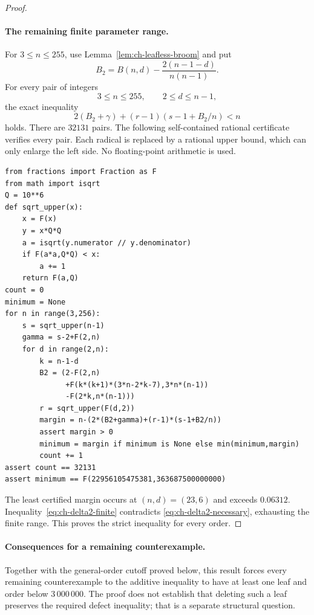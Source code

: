 \documentclass[11pt,a4paper]{article}
\theoremstyle{remark}
\numberwithin{equation}{section}
\begin{document}
\begin{proof}
\paragraph{The remaining finite parameter range.}
For \(3\le n\le255\), use Lemma~\ref{lem:ch-leafless-broom} and put
\[
 B_2=B(n,d)-\frac{2(n-1-d)}{n(n-1)}.
\]
For every pair of integers
\[
 3\le n\le255,\qquad 2\le d\le n-1,
\]
the exact inequality
\begin{equation}\label{eq:ch-delta2-finite}
 2(B_2+\gamma)+(r-1)(s-1+B_2/n)<n
\end{equation}
holds. There are \(32131\) pairs. The following self-contained rational
certificate verifies every pair. Each radical is replaced by a rational
upper bound, which can only enlarge the left side. No floating-point
arithmetic is used.

\begin{lstlisting}[basicstyle=\ttfamily\footnotesize,breaklines=true]
from fractions import Fraction as F
from math import isqrt
Q = 10**6
def sqrt_upper(x):
    x = F(x)
    y = x*Q*Q
    a = isqrt(y.numerator // y.denominator)
    if F(a*a,Q*Q) < x:
        a += 1
    return F(a,Q)
count = 0
minimum = None
for n in range(3,256):
    s = sqrt_upper(n-1)
    gamma = s-2+F(2,n)
    for d in range(2,n):
        k = n-1-d
        B2 = (2-F(2,n)
              +F(k*(k+1)*(3*n-2*k-7),3*n*(n-1))
              -F(2*k,n*(n-1)))
        r = sqrt_upper(F(d,2))
        margin = n-(2*(B2+gamma)+(r-1)*(s-1+B2/n))
        assert margin > 0
        minimum = margin if minimum is None else min(minimum,margin)
        count += 1
assert count == 32131
assert minimum == F(22956105475381,363687500000000)
\end{lstlisting}
The least certified margin occurs at \((n,d)=(23,6)\) and exceeds
\(0.06312\). Inequality~\eqref{eq:ch-delta2-finite} contradicts
\eqref{eq:ch-delta2-necessary}, exhausting the finite range. This proves
the strict inequality for every order.
\end{proof}

\paragraph{Consequences for a remaining counterexample.}
Together with the general-order cutoff proved below, this result forces every
remaining counterexample to the additive inequality to have at least
one leaf and order below \(3\,000\,000\). The proof does not establish
that deleting such a leaf preserves the required defect inequality;
that is a separate structural question.
\end{document}

